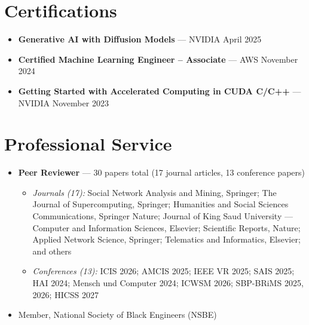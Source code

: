 \documentclass[11pt, letterpaper]{article}
\begin{document}
\section{Certifications}

\begin{itemize}
  \item \textbf{Generative AI with Diffusion Models} --- NVIDIA \hfill April 2025
  \item \textbf{Certified Machine Learning Engineer -- Associate} --- AWS \hfill November 2024
  \item \textbf{Getting Started with Accelerated Computing in CUDA C/C++} --- NVIDIA \hfill November 2023
\end{itemize}

\section{Professional Service}

\begin{itemize}
  \item \textbf{Peer Reviewer} --- 30 papers total (17 journal articles, 13 conference papers)
  \begin{itemize}[topsep=2pt]
    \item \textit{Journals (17):} Social Network Analysis and Mining, Springer; The Journal of Supercomputing, Springer; Humanities and Social Sciences Communications, Springer Nature; Journal of King Saud University --- Computer and Information Sciences, Elsevier; Scientific Reports, Nature; Applied Network Science, Springer; Telematics and Informatics, Elsevier; and others
    \item \textit{Conferences (13):} ICIS 2026; AMCIS 2025; IEEE VR 2025; SAIS 2025; HAI 2024; Mensch und Computer 2024; ICWSM 2026; SBP-BRiMS 2025, 2026; HICSS 2027
  \end{itemize}
  \item Member, National Society of Black Engineers (NSBE)
\end{itemize}
\end{document}
